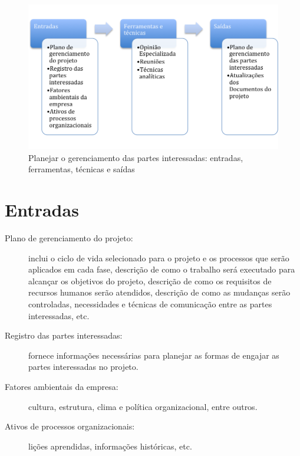 \begin{figure}[!h]
	\centering
	\includegraphics[scale=0.5]{Figuras/stakeholders_efts_gerenciar.png}
	\caption{Planejar o gerenciamento das partes interessadas: entradas, ferramentas, técnicas e saídas}
	\label{fig:sh:ger:efts}
\end{figure}

\section{Entradas}

\begin{description}
	
	\item[Plano de gerenciamento do projeto:] inclui o ciclo de vida selecionado para o projeto e os processos que serão aplicados em cada fase, descrição de como o trabalho será executado para alcançar os objetivos do projeto, descrição de como os requisitos de recursos humanos serão atendidos, descrição de como as mudanças serão controladas, necessidades e técnicas de comunicação entre as partes interessadas, etc.
	
	\item[Registro das partes interessadas:] fornece informações necessárias para planejar as formas de engajar as partes interessadas no projeto.
	
	\item[Fatores ambientais da empresa:] cultura, estrutura, clima e política organizacional, entre outros.
	
	\item[Ativos de processos organizacionais:] lições aprendidas, informações históricas, etc.
	
\end{description}

